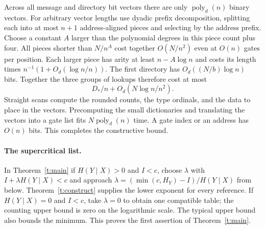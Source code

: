 Across all message and directory bit vectors there are only $\operatorname{poly}_d(n)$ binary vectors. For arbitrary vector lengths use dyadic prefix decomposition, splitting each into at most $n+1$ address-aligned pieces and selecting by the address prefix. Choose a constant $A$ larger than the polynomial degrees in this piece count plus four. All pieces shorter than $N/n^A$ cost together $O(N/n^2)$ even at $O(n)$ gates per position. Each larger piece has arity at least $n-A\log n$ and costs its length times $n^{-1}(1+O_d(\log n/n))$. The first directory has $O_d((N/b)\log n)$ bits. Together the three groups of lookups therefore cost at most
\[
             D_*/n+O_d(N\log n/n^2).
\]
Straight scans compute the rounded counts, the type ordinals, and the data to place in the vectors. Precomputing the small dictionaries and translating the vectors into a gate list fits $N\operatorname{poly}_d(n)$ time. A gate index or an address has $O(n)$ bits. This completes the constructive bound.

\paragraph{The supercritical list.} In Theorem~\ref{t:main} if $H(Y\mid X)>0$ and $I<c$, choose $\lambda$ with $I+\lambda H(Y\mid X)<c$ and approach $\lambda=(\min(c,H_Y)-I)/H(Y\mid X)$ from below. Theorem~\ref{t:construct} supplies the lower exponent for every reference. If $H(Y\mid X)=0$ and $I<c$, take $\lambda=0$ to obtain one compatible table; the counting upper bound is zero on the logarithmic scale. The typical upper bound also bounds the minimum. This proves the first assertion of Theorem~\ref{t:main}.
